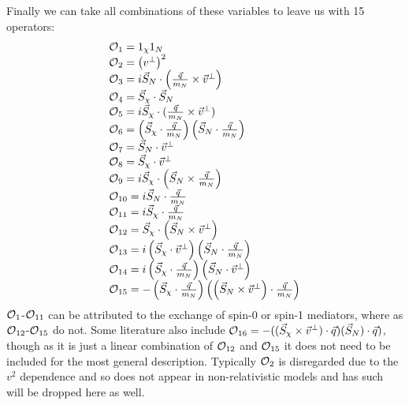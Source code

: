 \par
Finally we can take all combinations of these variables to leave us with 15 operators:
\begin{equation}
\begin{array}{lcl}
\operatorname{\mathcal{O}}_{1}=1_{\chi}1_N \\ 
\operatorname{\mathcal{O}}_{2}=\left(v^{\perp}\right)^{2} \\
\operatorname{\mathcal{O}}_{3}=i \vec{S}_{N} \cdot\left(\frac{\vec{q}}{m_N} \times \vec{v}^{\perp}\right) \\ 
\operatorname{\mathcal{O}}_{4}=\vec{S}_{\chi} \cdot \vec{S}_{N} \\ 
\operatorname{\mathcal{O}}_{5}=i \vec{S}_{\chi} \cdot(\frac{\vec{q}}{m_N} \times \vec{v}^{\perp}) \\ 
\operatorname{\mathcal{O}}_{6}=\left(\vec{S}_{\chi} \cdot \frac{\vec{q}}{m_N}\right)\left(\vec{S}_{N} \cdot \frac{\vec{q}}{m_N}\right) \\
\operatorname{\mathcal{O}}_{7}=\vec{S}_{N} \cdot \vec{v}^{\perp} \\
\operatorname{\mathcal{O}}_{8}=\vec{S}_{\chi} \cdot \vec{v}^{\perp} \\ 
\operatorname{\mathcal{O}}_{9}=i \vec{S}_{\chi} \cdot\left(\vec{S}_{N} \times \frac{\vec{q}}{m_N}\right) \\
\operatorname{\mathcal{O}}_{10}=i \vec{S}_{N} \cdot \frac{\vec{q}}{m_N} \\ 
\operatorname{\mathcal{O}}_{11}=i \vec{S}_{\chi} \cdot \frac{\vec{q}}{m_N} \\
\operatorname{\mathcal{O}}_{12} =\vec{S}_{\chi} \cdot\left(\vec{S}_{N} \times \vec{v}^{\perp}\right) \\
\operatorname{\mathcal{O}}_{13} =i\left(\vec{S}_{\chi} \cdot \vec{v}^{\perp}\right)\left(\vec{S}_{N} \cdot \frac{\vec{q}}{m_N}\right) \\ 
\operatorname{\mathcal{O}}_{14} =i\left(\vec{S}_{\chi} \cdot \frac{\vec{q}}{m_N}\right)\left(\vec{S}_{N} \cdot \vec{v}^{\perp}\right) \\ 
\operatorname{\mathcal{O}}_{15} =-\left(\vec{S}_{\chi} \cdot \frac{\vec{q}}{m_N}\right)\left(\left(\vec{S}_{N} \times \vec{v}^{\perp}\right) \cdot \frac{\vec{q}}{m_N}\right)
\end{array}
\label{eq:EFT_Operators}
\end{equation}
$\operatorname{\mathcal{O}}_{1}$-$\operatorname{\mathcal{O}}_{11}$ can be attributed to the exchange of spin-0 or spin-1 mediators, where as $\operatorname{\mathcal{O}}_{12}$-$\operatorname{\mathcal{O}}_{15}$ do not.
Some literature also include $\operatorname{\mathcal{O}}_{16}=-((\vec{S}_\chi \times \vec{v}^{\bot}) \cdot \vec{q})(\vec{S}_N) \cdot \vec{q})$, though as it is just a linear combination of $\operatorname{\mathcal{O}}_{12}$ and $\operatorname{\mathcal{O}}_{15}$ it does not need to be included for the most general description.
Typically $\operatorname{\mathcal{O}}_{2}$ is disregarded due to the $v^{2}$ dependence and so does not appear in non-relativistic models and has such will be dropped here as well.

